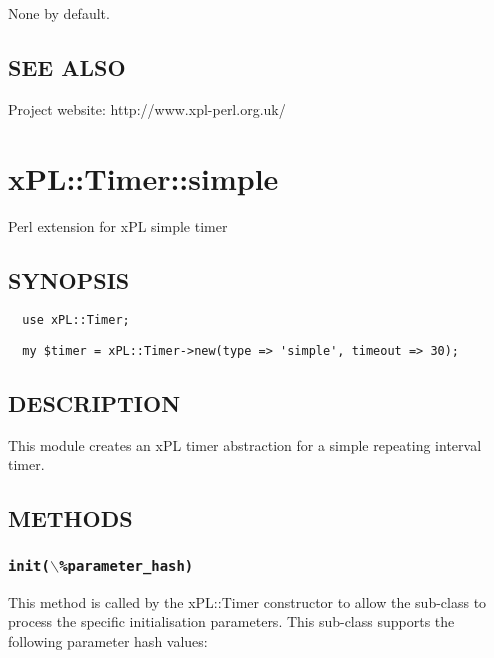\documentclass[12pt,a4paper]{article}
\begin{document}
None by default.

\subsection*{SEE ALSO\label{xPL::Timer::recurrence_SEE_ALSO}}


Project website: http://www.xpl-perl.org.uk/

\newpage
\section{xPL::Timer::simple\label{xPL::Timer::simple}}


Perl extension for xPL simple timer

\subsection*{SYNOPSIS\label{xPL::Timer::simple_SYNOPSIS}}
\begin{verbatim}
  use xPL::Timer;
\end{verbatim}
\begin{verbatim}
  my $timer = xPL::Timer->new(type => 'simple', timeout => 30);
\end{verbatim}
\subsection*{DESCRIPTION\label{xPL::Timer::simple_DESCRIPTION}}


This module creates an xPL timer abstraction for a simple repeating
interval timer.

\subsection*{METHODS\label{xPL::Timer::simple_METHODS}}
\subsubsection*{\texttt{init($\backslash$\%parameter\_hash)}\label{xPL::Timer::simple_init_backslash_parameter_hash_}}


This method is called by the xPL::Timer constructor to allow the
sub-class to process the specific initialisation parameters.  This
sub-class supports the following parameter hash values:
\end{document}
